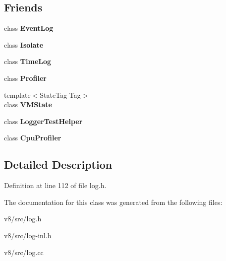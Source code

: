 \subsection*{Friends}
\begin{DoxyCompactItemize}
\item 
\mbox{\label{classv8_1_1internal_1_1Logger_a640116136ce15d7180db4807ac2fbe77}} 
class {\bfseries Event\+Log}
\item 
\mbox{\label{classv8_1_1internal_1_1Logger_aba4f0964bdacf2bbf62cf876e5d28d0a}} 
class {\bfseries Isolate}
\item 
\mbox{\label{classv8_1_1internal_1_1Logger_a1c4918f5f53a4fc9fcdaa6bca4bf5204}} 
class {\bfseries Time\+Log}
\item 
\mbox{\label{classv8_1_1internal_1_1Logger_ad73e5645d5b7b84a00d4a5d07b8d8078}} 
class {\bfseries Profiler}
\item 
\mbox{\label{classv8_1_1internal_1_1Logger_a625fbe66123c83b3cafa99a202c00225}} 
{\footnotesize template$<$State\+Tag Tag$>$ }\\class {\bfseries V\+M\+State}
\item 
\mbox{\label{classv8_1_1internal_1_1Logger_a4702c0b6e47a7a03f8fee92352c3209f}} 
class {\bfseries Logger\+Test\+Helper}
\item 
\mbox{\label{classv8_1_1internal_1_1Logger_acb7d0754758c89612a316001c25d07c4}} 
class {\bfseries Cpu\+Profiler}
\end{DoxyCompactItemize}


\subsection{Detailed Description}


Definition at line 112 of file log.\+h.



The documentation for this class was generated from the following files\+:\begin{DoxyCompactItemize}
\item 
v8/src/log.\+h\item 
v8/src/log-\/inl.\+h\item 
v8/src/log.\+cc\end{DoxyCompactItemize}
